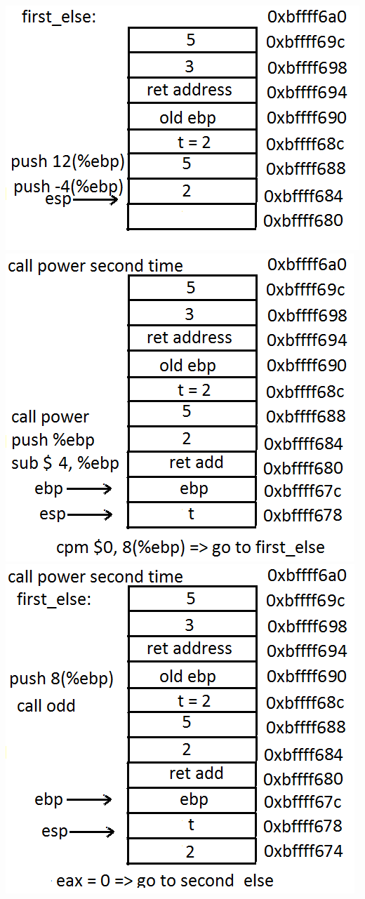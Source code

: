 \documentclass{article}
\begin{document}
\includegraphics[scale=0.5]{stack7.png}
\includegraphics[scale=0.5]{stack8.png}\\
\includegraphics[scale=0.5]{stack9.png}
\end{document}
